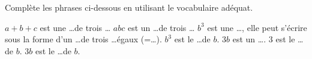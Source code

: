%
%
Complète les phrases ci-dessous en utilisant le vocabulaire adéquat.
  \begin{tasks}
    \task $a+b+c$ est une \dots de trois \dots
    \task $abc$ est un \dots de trois \dots
    \task $b^3$ est une \dots, elle peut s'écrire sous la forme d'un \dots de trois \dots égaux (=\dots). $b^3$ est le \dots de $b$.
    \task $3b$ est un \dots. $3$ est le \dots de $b$. $3b$ est le \dots de $b$.
  \end{tasks}
